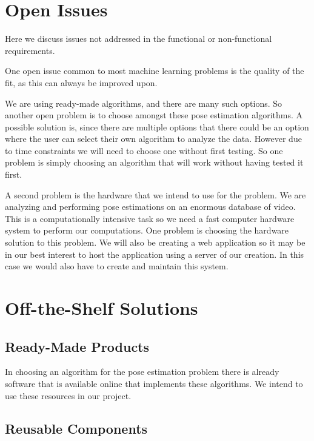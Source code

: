\documentclass{scrreprt}
\begin{document}
\section{Open Issues}

{Here we discuss issues not addressed in the functional or
non-functional requirements.}

One open issue common to most machine learning problems is the quality of the
fit, as this can always be improved upon.

We are using ready-made algorithms, and there are many such options. So
another open problem is to choose amongst these pose estimation algorithms. A
possible solution is, since there are multiple options that there could be an
option where the user can select their own algorithm to analyze the data.
However due to time constraints we will need to choose one without first
testing. So one problem is simply choosing an algorithm that will work without
having tested it first.

A second problem is the hardware that we intend to use for the problem.
We are analyzing and performing pose estimations on an enormous
database of video. This is a computationally intensive task so we need
a fast computer hardware system to perform our computations. One
problem is choosing the hardware solution to this problem. We will also
be creating a web application so it may be in our best interest to host
the application using a server of our creation. In this case we would
also have to create and maintain this system.

\section{Off-the-Shelf Solutions}
\label{off-the-shelf-solutions}

\subsection{Ready-Made Products}

{In choosing an algorithm for the pose estimation problem there is
already software that is available online that implements these
algorithms. We intend to use these resources in our project.}

\subsection{Reusable Components}
\label{reusable-components}
\end{document}
